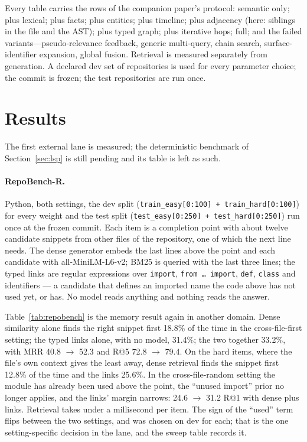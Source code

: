 \documentclass[11pt]{article}
\begin{document}
Every table carries the rows of the companion paper's protocol: semantic
only; plus lexical; plus facts; plus entities; plus timeline; plus adjacency
(here: siblings in the file and the AST); plus typed graph; plus iterative
hops; full; and the failed variants---pseudo-relevance feedback, generic
multi-query, chain search, surface-identifier expansion, global fusion.
Retrieval is measured separately from generation. A declared dev set of
repositories is used for every parameter choice; the commit is frozen; the
test repositories are run once.

\section{Results}
\label{sec:results}

The first external lane is measured; the deterministic benchmark of
Section~\ref{sec:lsp} is still pending and its table is left as such.

\paragraph{RepoBench-R.} Python, both settings, the dev split
(\texttt{train\_easy[0:100] + train\_hard[0:100]}) for every weight and the
test split (\texttt{test\_easy[0:250] + test\_hard[0:250]}) run once at the
frozen commit. Each item is a completion point with about twelve candidate
snippets from other files of the repository, one of which the next line
needs. The dense generator embeds the last lines above the point and each
candidate with all-MiniLM-L6-v2; BM25 is queried with the last three lines;
the typed links are regular expressions over \texttt{import}, \texttt{from
\ldots\ import}, \texttt{def}, \texttt{class} and identifiers — a candidate
that defines an imported name the code above has not used yet, or has. No
model reads anything and nothing reads the answer.

Table~\ref{tab:repobench} is the memory result again in another domain.
Dense similarity alone finds the right snippet first 18.8\% of the time in
the cross-file-first setting; the typed links alone, with no model, 31.4\%;
the two together 33.2\%, with MRR 40.8 $\rightarrow$ 52.3 and R@5 72.8
$\rightarrow$ 79.4. On the hard items, where the file's own context gives
the least away, dense retrieval finds the snippet first 12.8\% of the time
and the links 25.6\%. In the cross-file-random setting the module has
already been used above the point, the ``unused import'' prior no longer
applies, and the links' margin narrows: 24.6 $\rightarrow$ 31.2 R@1 with
dense plus links. Retrieval takes under a millisecond per item. The sign of
the ``used'' term flips between the two settings, and was chosen on dev for
each; that is the one setting-specific decision in the lane, and the sweep
table records it.
\end{document}
